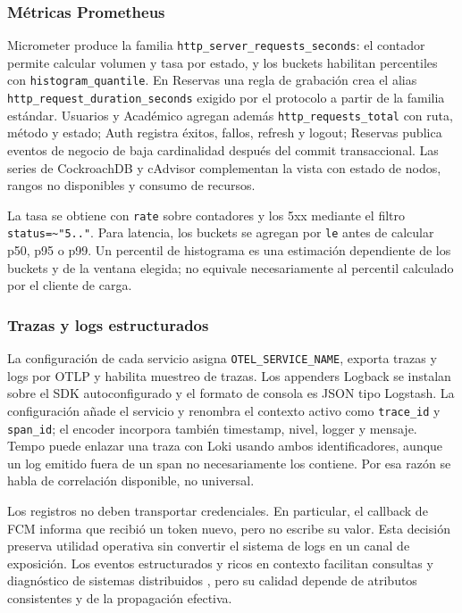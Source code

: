 \subsubsection{Métricas Prometheus}

Micrometer produce la familia
\texttt{http\_server\_requests\_seconds}: el contador permite calcular volumen y
tasa por estado, y los buckets habilitan percentiles con
\texttt{histogram\_quantile}. En Reservas una regla de grabación crea el alias
\texttt{http\_request\_duration\_seconds} exigido por el protocolo a partir de
la familia estándar. Usuarios y Académico agregan además
\texttt{http\_requests\_total} con ruta, método y estado; Auth registra éxitos,
fallos, refresh y logout; Reservas publica eventos de negocio de baja
cardinalidad después del commit transaccional. Las series de CockroachDB y
cAdvisor complementan la vista con estado de nodos, rangos no disponibles y
consumo de recursos.

La tasa se obtiene con \texttt{rate} sobre contadores y los 5xx mediante el
filtro \texttt{status=\textasciitilde{}"5.."}. Para latencia, los buckets se
agregan por \texttt{le} antes de calcular p50, p95 o p99. Un percentil de
histograma es una estimación dependiente de los buckets y de la ventana elegida;
no equivale necesariamente al percentil calculado por el cliente de carga.

\subsubsection{Trazas y logs estructurados}

La configuración de cada servicio asigna \texttt{OTEL\_SERVICE\_NAME}, exporta
trazas y logs por OTLP y habilita muestreo de trazas. Los appenders Logback se
instalan sobre el SDK autoconfigurado y el formato de consola es JSON tipo
Logstash. La configuración añade el servicio y renombra el contexto activo como
\texttt{trace\_id} y \texttt{span\_id}; el encoder incorpora también timestamp,
nivel, logger y mensaje. Tempo puede enlazar una traza con Loki usando ambos
identificadores, aunque un log emitido fuera de un span no necesariamente los
contiene. Por esa razón se habla de correlación disponible, no universal.

Los registros no deben transportar credenciales. En particular, el callback de
FCM informa que recibió un token nuevo, pero no escribe su valor. Esta decisión
preserva utilidad operativa sin convertir el sistema de logs en un canal de
exposición. Los eventos estructurados y ricos en contexto facilitan consultas y
diagnóstico de sistemas distribuidos \cite{majors2022observability}, pero su
calidad depende de atributos consistentes y de la propagación efectiva.

